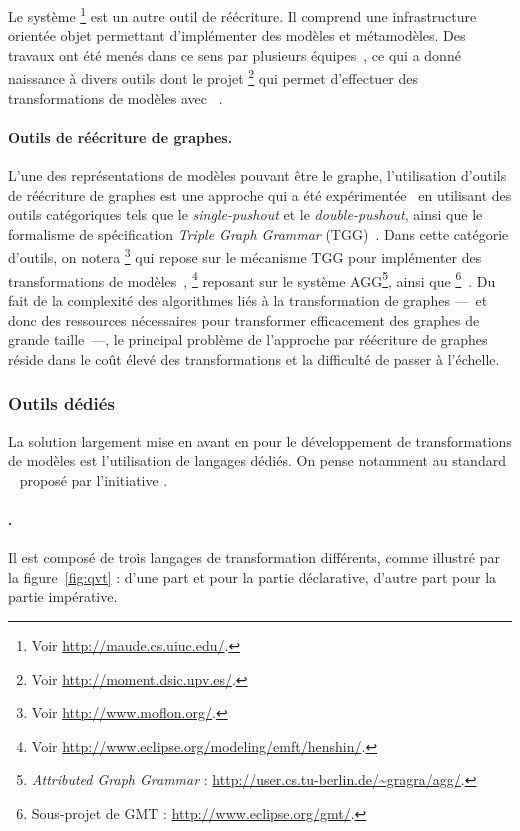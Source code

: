 Le système {\maude}\footnote{Voir \url{http://maude.cs.uiuc.edu/}.}\cite{Clavel1996,
Clavel1996a, Clavel2002} est un autre outil de réécriture. Il comprend une
infrastructure orientée objet permettant d'implémenter des modèles et
métamodèles. Des travaux ont été menés dans ce sens par plusieurs
équipes~\cite{Romero2007,Rivera2008,Rusu2011}, ce qui a donné naissance à
divers outils dont le projet
{\moment}\footnote{Voir \url{http://moment.dsic.upv.es/}.} qui permet d'effectuer des
transformations de modèles {\emf} avec {\maude}~\cite{Boronat2009,Boronat2010}.

\paragraph{Outils de réécriture de graphes.} L'une des représentations de
modèles pouvant être le graphe, l'utilisation d'outils de réécriture de graphes
est une approche qui a été expérimentée~\cite{Taentzer10,Schurr2008} en
utilisant des outils catégoriques tels que le \emph{single-pushout} et le
\emph{double-pushout}, ainsi que le formalisme de spécification \emph{Triple
Graph Grammar} (TGG)~\cite{Konigs2005}. Dans cette catégorie d'outils, on
notera {\moflon}\footnote{Voir \url{http://www.moflon.org/}.} qui repose sur le
mécanisme TGG pour implémenter des transformations de
modèles~\cite{Amelunxen2006},
{\henshin}\footnote{Voir \url{http://www.eclipse.org/modeling/emft/henshin/}.}\cite{Arendt2010}
reposant sur le système AGG\footnote{\emph{Attributed Graph Grammar} :
\url{http://user.cs.tu-berlin.de/~gragra/agg/}.}\cite{Taentzer2004}, ainsi que
{\viatra}\footnote{Sous-projet de GMT :
  \url{http://www.eclipse.org/gmt/}.}~\cite{Varro2007}. Du fait de la complexité
  des algorithmes liés à la transformation de graphes ---~et donc des
  ressources nécessaires pour transformer efficacement des graphes de grande
  taille~---, le principal problème de l'approche par réécriture de graphes
  réside dans le coût élevé des transformations et la difficulté de passer à
  l'échelle.%

\subsubsection{Outils dédiés}
La solution largement mise en avant en {\idm} pour le développement de
transformations de modèles est l'utilisation de langages dédiés. On pense
notamment au standard {\qvt}~\cite{omgqvt1} proposé par l'initiative {\mda}.

\paragraph{{\qvt}.}Il est composé de trois langages de transformation
différents, comme illustré par la figure~\ref{fig:qvt} : d'une part {\qvtr} et
{\qvtc} pour la partie déclarative, d'autre part {\qvto} pour la partie
impérative.

